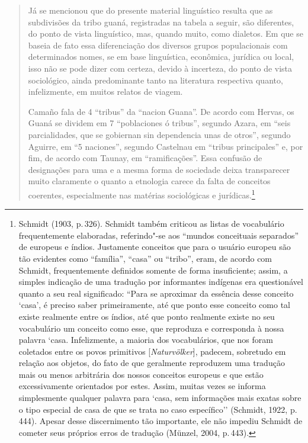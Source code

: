 \begin{quote}
Já se mencionou que do presente material linguístico resulta que as
subdivisões da tribo guaná, registradas na tabela a seguir, são
diferentes, do ponto de vista linguístico, mas, quando muito, como
dialetos. Em que se baseia de fato essa diferenciação dos diversos
grupos populacionais com determinados nomes, se em base linguística,
econômica, jurídica ou local, isso não se pode dizer com certeza, devido
à incerteza, do ponto de vista sociológico, ainda predominante tanto na
literatura respectiva quanto, infelizmente, em muitos relatos de
viagem.

Camaño fala de 4 ``tribus'' da ``nacion Guana''. De acordo com Hervas,
os Guaná se dividem em 7 ``poblaciones ó tribus'', segundo Azara, em
``seis parcialidades, que se gobiernan sin dependencia unas de otros'',
segundo Aguirre, em ``5 naciones'', segundo Castelnau em ``tribus
principales'' e, por fim, de acordo com Taunay, em ``ramificações''.
Essa confusão de designações para uma e a mesma forma de sociedade
deixa transparecer muito claramente o quanto a etnologia carece da falta
de conceitos coerentes, especialmente nas matérias sociológicas e
jurídicas.\footnote{Schmidt (1903, p.\,326). Schmidt também criticou as
  listas de vocabulário frequentemente elaboradas, referindo"-se aos
  ``mundos conceituais separados'' de europeus e índios. Justamente
  conceitos que para o usuário europeu são tão evidentes como
  ``família'', ``casa'' ou ``tribo'', eram, de acordo com Schmidt,
  frequentemente definidos somente de forma insuficiente; assim, a
  simples indicação de uma tradução por informantes indígenas era
  questionável quanto a seu real significado: ``Para se aproximar da
  essência desse conceito `casa', é preciso saber primeiramente, até que
  ponto esse conceito como tal existe realmente entre os índios, até que
  ponto realmente existe no seu vocabulário um conceito como esse, que
  reproduza e corresponda à nossa palavra `casa. Infelizmente, a
  maioria dos vocabulários, que nos foram coletados entre os povos
  primitivos {[}\textit{Naturvölker}{]}, padecem, sobretudo em relação aos
  objetos, do fato de que geralmente reproduzem uma tradução mais ou
  menos arbitrária dos nossos conceitos europeus e que estão
  excessivamente orientados por estes. Assim, muitas vezes se informa
  simplesmente qualquer palavra para `casa, sem informações mais exatas
  sobre o tipo especial de casa de que se trata no caso específico''
  (Schmidt, 1922, p.\,444). Apesar desse discernimento tão importante,
  ele não impediu Schmidt de cometer seus próprios erros de tradução
  (Münzel, 2004, p.\,443).}
\end{quote}

